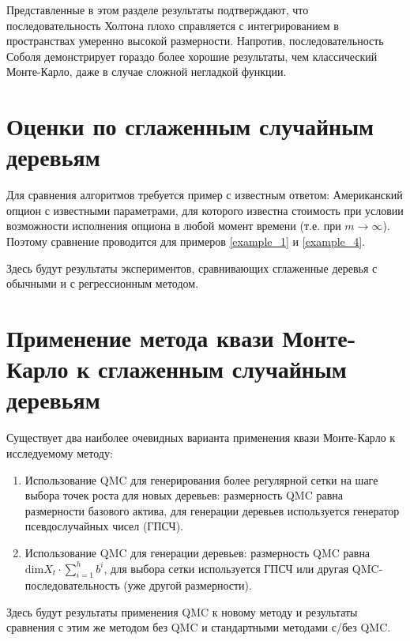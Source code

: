 

Представленные в этом разделе результаты подтверждают, что последовательность Холтона плохо справляется с интегрированием в пространствах умеренно высокой размерности. Напротив, последовательность Соболя демонстрирует гораздо более хорошие результаты, чем классический Монте-Карло, даже в случае сложной негладкой функции.


\section{Оценки по сглаженным случайным деревьям} %
\label{sec:results:pruned_trees}

Для сравнения алгоритмов требуется пример с известным ответом: Американский опцион с известными параметрами, для которого известна стоимость при условии возможности исполнения опциона в любой момент времени (т.е. при $m \to \infty$). Поэтому сравнение проводится для примеров \ref{example_1} и \ref{example_4}.

Здесь будут результаты экспериментов, сравнивающих сглаженные деревья с обычными и с регрессионным методом.


\section{Применение метода квази Монте-Карло к сглаженным случайным деревьям} %
\label{sec:results:qmc_to_pruned_trees}

Существует два наиболее очевидных варианта применения квази Монте-Карло к исследуемому методу:

\begin{enumerate}
	\item Использование QMC для генерирования более регулярной сетки на шаге выбора точек роста для новых деревьев: размерность QMC равна размерности базового актива, для генерации деревьев используется генератор псевдослучайных чисел (ГПСЧ).
	\item Использование QMC для генерации деревьев: размерность QMC равна $\mathrm{dim} X_t \cdot \sum_{i=1}^h b^i$, для выбора сетки используется ГПСЧ или другая QMC-последовательность (уже другой размерности).
\end{enumerate}

Здесь будут результаты применения QMC к новому методу и результаты сравнения с этим же методом без QMC и стандартными методами с/без QMC.

